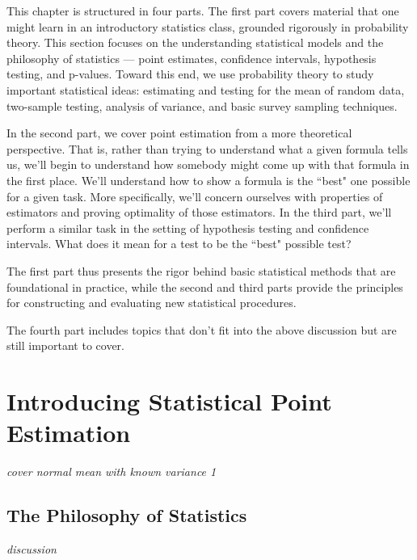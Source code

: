 \documentclass[../../../main.tex]{subfiles}
\begin{document}

This chapter is structured in four parts. The first part covers material that one might learn in an introductory statistics class, grounded rigorously in probability theory. This section focuses on the understanding statistical models and the philosophy of statistics --- point estimates, confidence intervals, hypothesis testing, and p-values. Toward this end, we use probability theory to study important statistical ideas: estimating and testing for the mean of random data, two-sample testing, analysis of variance, and basic survey sampling techniques.

In the second part, we cover point estimation from a more theoretical perspective. That is, rather than trying to understand what a given formula tells us, we'll begin to understand how somebody might come up with that formula in the first place. We'll understand how to show a formula is the ``best" one possible for a given task. More specifically, we'll concern ourselves with properties of estimators and proving optimality of those estimators. In the third part, we'll perform a similar task in the setting of hypothesis testing and confidence intervals. What does it mean for a test to be the ``best" possible test?

The first part thus presents the rigor behind basic statistical methods that are foundational in practice, while the second and third parts provide the principles for constructing and evaluating new statistical procedures.

The fourth part includes topics that don't fit into the above discussion but are still important to cover.

\section{Introducing Statistical Point Estimation}
\textit{cover normal mean with known variance 1}

\subsection{The Philosophy of Statistics}

\textit{discussion}
\end{document}
